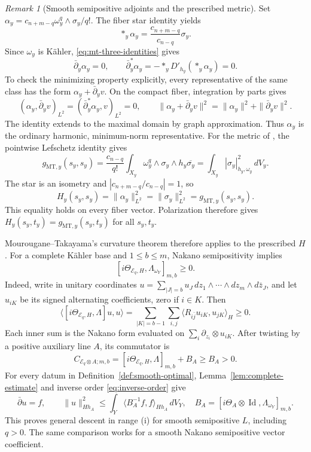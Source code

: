 \documentclass[11pt,reqno]{amsart}
\numberwithin{equation}{section}
\theoremstyle{definition}
\theoremstyle{remark}
\newtheorem{remark}[theorem]{Remark}
\begin{document}
\begin{remark}[Smooth semipositive adjoints and the prescribed metric]
Set $\alpha_y=c_{n+m-q}\omega_y^q\wedge\sigma_y/q!$.
The fiber star identity \cite[Corollary 2.2]{MT08} yields
\[
 *_y\alpha_y=\frac{c_{n+m-q}}{c_{n-q}}\sigma_y.
\]
Since $\omega_y$ is K\"ahler, \eqref{eq:mt-three-identities} gives
\[
 \bar\partial_y\alpha_y=0,\qquad
 \bar\partial_y^*\alpha_y
 =-*_yD'_{h_y}(*_y\alpha_y)=0.
\]
To check the minimizing property explicitly, every representative
of the same class has the form $\alpha_y+\bar\partial_y v$.  On the
compact fiber, integration by parts gives
\[
 (\alpha_y,\bar\partial_y v)_{L^2}
   =(\bar\partial_y^*\alpha_y,v)_{L^2}=0,\qquad
 \|\alpha_y+\bar\partial_yv\|^2
   =\|\alpha_y\|^2+\|\bar\partial_yv\|^2.
\]
The identity extends to the maximal domain by graph approximation.
Thus $\alpha_y$ is the ordinary harmonic, minimum-norm representative.
For the metric of \cite[Definition 5.1]{MT08}, the pointwise
Lefschetz identity gives
\[
 g_{\mathrm{MT},y}(s_y,s_y)
   =\frac{c_{n-q}}{q!}\int_{X_y}
      \omega_y^q\wedge\sigma_y\wedge h_y\overline{\sigma_y}
   =\int_{X_y}|\sigma_y|_{h_y,\omega_y}^2\,dV_y.
\]
The star is an isometry and $|c_{n+m-q}/c_{n-q}|=1$, so
\begin{equation}\label{eq:mt-metric-equality}
 H_y(s_y,s_y)=\|\alpha_y\|^2_{L^2}
             =\|\sigma_y\|^2_{L^2}
             =g_{\mathrm{MT},y}(s_y,s_y).
\end{equation}
This equality holds on every fiber vector.  Polarization therefore
gives $H_y(s_y,t_y)=g_{\mathrm{MT},y}(s_y,t_y)$ for all $s_y,t_y$.

Mourougane--Takayama's curvature theorem therefore applies to
the prescribed $H$.  For a complete K\"ahler base and
$1\le b\le m$, Nakano semipositivity implies
\[
 [i\Theta_{\mathcal E_q,H},\Lambda_{\omega_Y}]_{m,b}\ge0.
\]
Indeed, write in unitary coordinates
$u=\sum_{|J|=b}u_J\,dz_1\wedge\cdots\wedge dz_m\wedge d\bar z_J$,
and let $u_{iK}$ be its signed alternating coefficients, zero if
$i\in K$.  Then
\[
 \langle[i\Theta_{\mathcal E_q,H},\Lambda]u,u\rangle
   =\sum_{|K|=b-1}\sum_{i,j}
        \langle R_{i\bar j}u_{iK},u_{jK}\rangle_H\ge0.
\]
Each inner sum is the Nakano form evaluated on
$\sum_i\partial_{z_i}\otimes u_{iK}$.
After twisting by a positive auxiliary line $A$, its commutator is
\[
 C_{\mathcal E_q\otimes A;m,b}
   =[i\Theta_{\mathcal E_q,H},\Lambda]_{m,b}+B_A\ge B_A>0.
\]
For every datum in Definition~\ref{def:smooth-optimal},
Lemma~\ref{lem:complete-estimate} and inverse order
\eqref{eq:inverse-order} give
\[
 \bar\partial u=f,\qquad
 \|u\|^2_{Hh_A}
 \le\int_Y\langle B_A^{-1}f,f\rangle_{Hh_A}\,dV_Y,
 \quad B_A=[i\Theta_A\otimes\operatorname{Id},\Lambda_{\omega_Y}]_{m,b}.
\]
This proves general descent in range (i) for smooth semipositive
$L$, including $q>0$.  The same comparison works for a smooth Nakano
semipositive
vector coefficient.
\end{remark}
\end{document}
